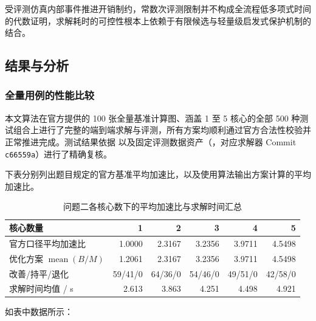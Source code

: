 \documentclass[anonymous,withtoc]{gmcm2026}
\begin{document}
受评测仿真内部事件推进开销制约，常数次评测限制并不构成全流程低多项式时间的代数证明，求解耗时的可控性根本上依赖于有限候选与轻量级启发式保护机制的结合。

\subsection{结果与分析}

\subsubsection{全量用例的性能比较}

本文算法在官方提供的 100 张全量基准计算图、涵盖 1 至 5 核心的全部 500 种测试组合上进行了完整的端到端求解与评测，所有方案均顺利通过官方合法性校验并正常推进完成。测试结果依据 \texttt{} 以及固定评测数据资产（\texttt{}，对应求解器 Commit \texttt{c66559a}）进行了精确复核。

下表分别列出题目规定的官方基准平均加速比，以及使用算法输出方案计算的平均加速比。

\begin{table}[!htbp]\centering
\caption{问题二各核心数下的平均加速比与求解时间汇总}\label{tab:05-p2-1}\normalsize

\begin{tabularx}{\linewidth}{@{}Xrrrrr@{}}\toprule
核心数量 & 1 & 2 & 3 & 4 & 5 \\
\midrule
官方口径平均加速比 & 1.0000 & 2.3167 & 3.2356 & 3.9711 & 4.5498 \\
优化方案 $\operatorname{mean}(B/M)$ & 1.2061 & 2.3167 & 3.2356 & 3.9711 & 4.5498 \\
改善/持平/退化 & 59/41/0 & 64/36/0 & 54/46/0 & 49/51/0 & 42/58/0 \\
求解时间均值 / s & 2.613 & 3.863 & 4.251 & 4.498 & 4.921 \\
\bottomrule\end{tabularx}\end{table}

如表中数据所示：
\end{document}

